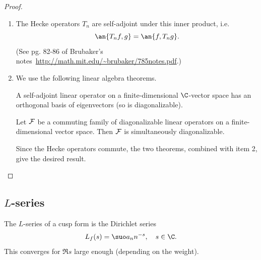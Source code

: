 \begin{proof}
\begin{enumerate}
(Here $\tau=x+yi$.) It's clear that this is positive definite.
Note the following:
\begin{enumerate}
\item
$\frac{dxdy}{y^2}$ is the Haar measure with respect to $\SL_2(\Z)$ (it is invariant under the action of $\SL_2(\Z)$).
\item
$f(\tau)\overline{g(\tau)} y^k$ is invariant under transformation by $\SL_2(\Z)$: Using
\[
\Im(A\tau)=\frac{\Im(\tau)}{|c\tau+d|^2}
\] 
we get 
\[f(A\tau)\overline{g(A\tau)}(\Im A\tau)^k=f(\tau)(c\tau+d)^{-k} g(\tau)\overline{(c\tau+d)^{-k}}\frac{y^k}{|c\tau+d|^{2k}}=
f(\tau)\overline{g(\tau)}y^k.\]
\item The integral converges. Since $f$ is cuspidal, $f(\tau)=O(e^{-|\tau|})=O(e^{-y})$. Thus the integral is dominated by
\[
\int_{-\rc 2}^{\rc2}\int_c^{\iy} Ce^{-y}{y^{k-2}}\,dx\,dy<\iy.
\]
\end{enumerate}
\item The Hecke operators $T_n$ are self-adjoint under this inner product, i.e.
\[
\an{T_nf,g}=\an{f,T_ng}.
\]
(See pg. 82-86 of Brubaker's notes~\url{http://math.mit.edu/~brubaker/785notes.pdf}.)
\item We use the following linear algebra theorems.
\begin{thm}
A self-adjoint linear operator on a finite-dimensional $\C$-vector space has an orthogonal basis of eigenvectors (so is diagonalizable).
\end{thm}
\begin{thm}
Let $\cal F$ be a commuting family of diagonalizable linear operators on a finite-dimensional vector space. Then $\cal F$ is simultaneously diagonalizable.
\end{thm}
Since the Hecke operators commute, the two theorems, combined with item 2, give the desired result.
\end{enumerate}
\end{proof}
\subsection{$L$-series}
The $L$-series of a cusp form is the Dirichlet series
\[
L_f(s)=\suo a_nn^{-s},\quad s\in \C.
\]
This converges for $\Re s$ large enough (depending on the weight).

